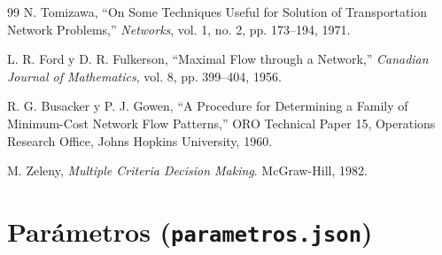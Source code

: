 \documentclass{article}
\begin{document}
\begin{thebibliography}{99}
N. Tomizawa,
``On Some Techniques Useful for Solution of Transportation Network Problems,''
\textit{Networks},
vol. 1, no. 2, pp. 173--194, 1971.

L. R. Ford y D. R. Fulkerson,
``Maximal Flow through a Network,''
\textit{Canadian Journal of Mathematics},
vol. 8, pp. 399--404, 1956.

R. G. Busacker y P. J. Gowen,
``A Procedure for Determining a Family of Minimum-Cost Network Flow Patterns,''
ORO Technical Paper 15, Operations Research Office, Johns Hopkins University, 1960.

M. Zeleny,
\textit{Multiple Criteria Decision Making}.
McGraw-Hill, 1982.

\end{thebibliography}

\appendix
\section{Parámetros (\texttt{parametros.json})}
\label{sec:anexo-param}
\end{document}
